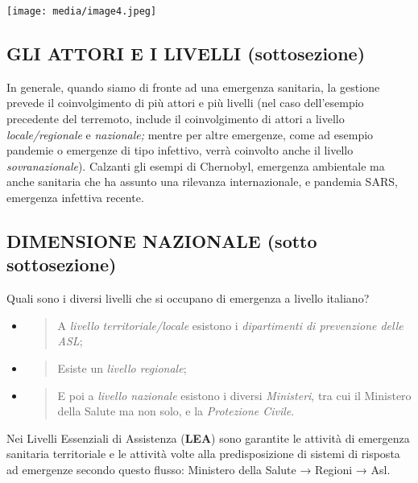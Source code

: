 \documentclass[]{article}
\begin{document}
\texttt{[image: media/image4.jpeg]}

\subsection{GLI ATTORI E I LIVELLI
(sottosezione)}\label{gli-attori-e-i-livelli-sottosezione}

In generale, quando siamo di fronte ad una emergenza sanitaria, la
gestione prevede il coinvolgimento di più attori e più livelli (nel caso
dell'esempio precedente del terremoto, include il coinvolgimento di
attori a livello \emph{locale/regionale} e \emph{nazionale;} mentre per
altre emergenze, come ad esempio pandemie o emergenze di tipo infettivo,
verrà coinvolto anche il livello \emph{sovranazionale}). Calzanti gli
esempi di Chernobyl, emergenza ambientale ma anche sanitaria che ha
assunto una rilevanza internazionale, e pandemia SARS, emergenza
infettiva recente.

\subsection{DIMENSIONE NAZIONALE (sotto
sottosezione)}\label{dimensione-nazionale-sotto-sottosezione}

Quali sono i diversi livelli che si occupano di emergenza a livello
italiano?

\begin{itemize}
\item
  \begin{quote}
  A \emph{livello} \emph{territoriale/locale} esistono i
  \emph{dipartimenti di prevenzione delle ASL};
  \end{quote}
\item
  \begin{quote}
  Esiste un \emph{livello regionale};
  \end{quote}
\item
  \begin{quote}
  E poi a \emph{livello nazionale} esistono i diversi \emph{Ministeri},
  tra cui il Ministero della Salute ma non solo, e la \emph{Protezione
  Civile}.
  \end{quote}
\end{itemize}

Nei Livelli Essenziali di Assistenza (\textbf{LEA}) sono garantite le
attività di emergenza sanitaria territoriale e le attività volte alla
predisposizione di sistemi di risposta ad emergenze secondo questo
flusso: Ministero della Salute → Regioni → Asl.
\end{document}

